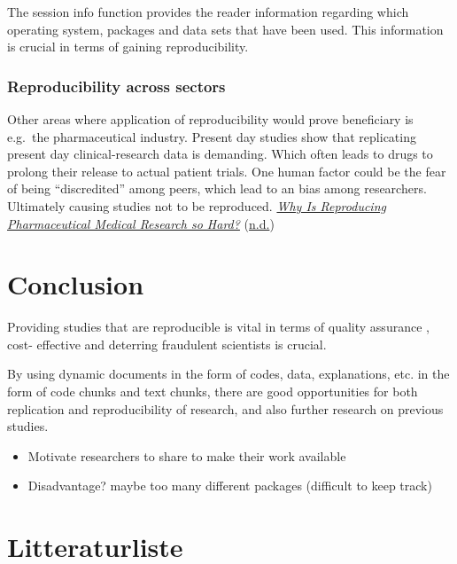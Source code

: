 \documentclass[
  12pt,
]{article}
\providecommand{\tightlist}{%
  \setlength{\itemsep}{0pt}\setlength{\parskip}{0pt}}
\begin{document}
The session info function provides the reader information regarding
which operating system, packages and data sets that have been used. This
information is crucial in terms of gaining reproducibility.

\hypertarget{reproducibility-across-sectors}{%
\subsubsection{Reproducibility across
sectors}\label{reproducibility-across-sectors}}

Other areas where application of reproducibility would prove beneficiary
is e.g.~the pharmaceutical industry. Present day studies show that
replicating present day clinical-research data is demanding. Which often
leads to drugs to prolong their release to actual patient trials. One
human factor could be the fear of being ``discredited'' among peers,
which lead to an bias among researchers. Ultimately causing studies not
to be reproduced. \protect\hyperlink{ref-Pharm-tech}{\emph{Why Is
Reproducing Pharmaceutical Medical Research so Hard?}}
(\protect\hyperlink{ref-Pharm-tech}{n.d.})

\hypertarget{conclusion}{%
\section{Conclusion}\label{conclusion}}

Providing studies that are reproducible is vital in terms of quality
assurance , cost- effective and deterring fraudulent scientists is
crucial.

By using dynamic documents in the form of codes, data, explanations,
etc. in the form of code chunks and text chunks, there are good
opportunities for both replication and reproducibility of research, and
also further research on previous studies.

\begin{itemize}
\tightlist
\item
  Motivate researchers to share to make their work available
\item
  Disadvantage? maybe too many different packages (difficult to keep
  track)
\end{itemize}

\newpage

\hypertarget{litteraturliste}{%
\section{Litteraturliste}\label{litteraturliste}}
\end{document}
